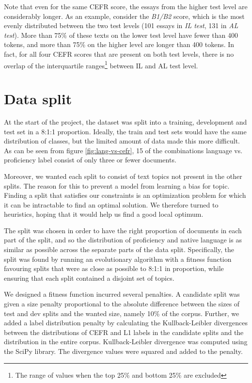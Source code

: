 Note that even for the same CEFR score, the essays from the higher test level
are considerably longer. As an example, consider the \emph{B1/B2} score,
which is the most evenly distributed between the two test levels (101 essays
in \emph{IL test}, 131 in \emph{AL test}). More than 75\% of these texts on
the lower test level have fewer than 400 tokens, and more than 75\% on the
higher level are longer than 400 tokens. In fact, for all four CEFR scores
that are present on both test levels, there is no overlap of the
interquartile ranges\footnote{The range of values when the top 25\% and
bottom 25\% are excluded} between IL and AL test level.


\section{Data split}

At the start of the project, the dataset was split into a training,
development and test set in a 8:1:1 proportion. Ideally, the train and test
sets would have the same distribution of classes, but the limited amount of
data made this more difficult. As can be seen from figure
\ref{fig:lang-vs-cefr}, 15 of the combinations language vs. proficiency label
consist of only three or fewer documents.

Moreover, we wanted each split to consist of text topics not present in the
other splits. The reason for this to prevent a model from learning a bias for
topic. Finding a split that satisfies our constraints is an optimization
problem for which it can be intractable to find an optimal solution. We
therefore turned to heuristics, hoping that it would help us find a good
local optimum.
 
The split was chosen in order to have the right proportion of documents in
each part of the split, and so the distribution of proficiency and native
language is as similar as possible across the separate parts of the data
split. Specifically, the split was found by running an evolutionary algorithm
with a fitness function favouring splits that were as close as possible to
8:1:1 in proportion, while ensuring that each split contained a disjoint set
of topics.

We designed a fitness function incurred several penalties. A candidate split
was given a size penalty proportional to the absolute difference between the
sizes of test and dev splits and the wanted size, namely 10\% of the corpus.
Further, we added a label distribution penalty by calculating the
Kullback-Leibler divergences between the distributions of CEFR and L1 labels
in the candidate splits and the distribution in the entire corpus.
Kullback-Leibler divergence was computed using the SciPy \autocite{scipy}
library. The divergence values were squared and added to the penalty.

